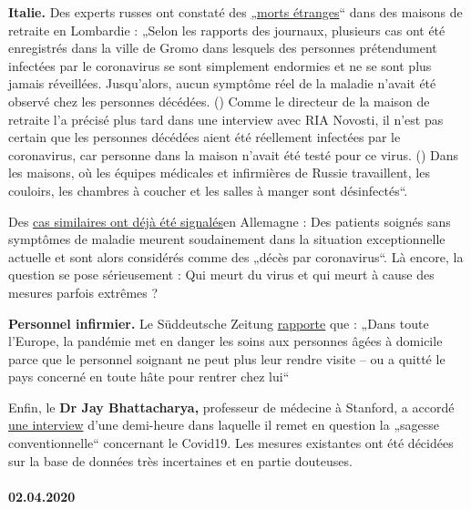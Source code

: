 \textbf{Italie.} Des experts russes ont constaté des
\href{https://de.sputniknews.com/panorama/20200402326767475-fachpersonal-todesfaelle-lombardei-zeitung/}{„morts
étranges}`` dans des maisons de retraite en Lombardie : „Selon les
rapports des journaux, plusieurs cas ont été enregistrés dans la ville
de Gromo dans lesquels des personnes prétendument infectées par le
coronavirus se sont simplement endormies et ne se sont plus jamais
réveillées. Jusqu'alors, aucun symptôme réel de la maladie n'avait été
observé chez les personnes décédées. () Comme le directeur de la maison
de retraite l'a précisé plus tard dans une interview avec RIA Novosti,
il n'est pas certain que les personnes décédées aient été réellement
infectées par le coronavirus, car personne dans la maison n'avait été
testé pour ce virus. () Dans les maisons, où les équipes médicales et
infirmières de Russie travaillent, les couloirs, les chambres à coucher
et les salles à manger sont désinfectés``.

Des
\href{https://web.archive.org/web/20200330082928/https://www.sueddeutsche.de/panorama/coronavirus-news-deutschland-wolfsburg-laschet-1.4828033}{cas
similaires ont déjà été signalés}en Allemagne : Des patients soignés
sans symptômes de maladie meurent soudainement dans la situation
exceptionnelle actuelle et sont alors considérés comme des „décès par
coronavirus``. Là encore, la question se pose sérieusement : Qui meurt
du virus et qui meurt à cause des mesures parfois extrêmes ?

\textbf{Personnel infirmier.} Le Süddeutsche Zeitung
\href{https://www.sueddeutsche.de/politik/coronavirus-pflegekraefte-ausland-1.4866124}{rapporte}
que : „Dans toute l'Europe, la pandémie met en danger les soins aux
personnes âgées à domicile parce que le personnel soignant ne peut plus
leur rendre visite -- ou a quitté le pays concerné en toute hâte pour
rentrer chez lui``

Enfin, le \textbf{Dr Jay Bhattacharya,} professeur de médecine à
Stanford, a accordé
\href{https://www.youtube.com/watch?v=-UO3Wd5urg0}{une interview} d'une
demi-heure dans laquelle il remet en question la „sagesse
conventionnelle`` concernant le Covid19. Les mesures existantes ont été
décidées sur la base de données très incertaines et en partie douteuses.

\hypertarget{02042020}{%
\paragraph{02.04.2020}\label{02042020}}

